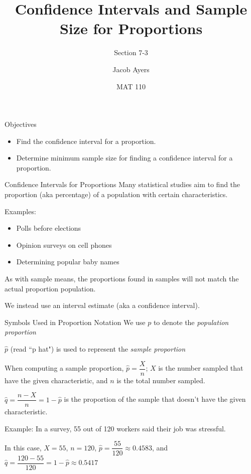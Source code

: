 \documentclass[t, aspectratio=169]{beamer}
\title[7-3]{Confidence Intervals and Sample Size for Proportions}
\subtitle{Section 7-3}
\author{Jacob Ayers}
\institute{Lesson \#23}
\date{MAT 110}
\newcommand{\?}{\stackrel{?}{=}}
\begin{document}
	
	\begin{frame}
		\titlepage
	\end{frame}
	
	\begin{frame}{Objectives}
		\begin{itemize}
			\item Find the confidence interval for a proportion.
			\item Determine minimum sample size for finding a confidence interval for a proportion.
		\end{itemize}
	\end{frame}

	\begin{frame}{Confidence Intervals for Proportions}
		Many statistical studies aim to find the proportion (aka percentage) of a population with certain characteristics. \pause
		
		Examples: \begin{itemize}
			\item Polls before elections \pause
			\item Opinion surveys on cell phones \pause
			\item Determining popular baby names \pause
		\end{itemize}
	
		As with sample means, the proportions found in samples will not match the actual proportion population. \pause
		
		We instead use an interval estimate (aka a confidence interval).
	\end{frame}

	\begin{frame}{Symbols Used in Proportion Notation}
		We use $p$ to denote the \textit{population proportion} \pause
		
		$\hat{p}$ (read ``p hat") is used to represent the \textit{sample proportion} \pause
		
		When computing a sample proportion, $\hat{p} = \dfrac{X}{n}$; $X$ is the number sampled that have the given characteristic, and $n$ is the total number sampled. \pause
		
		$\hat{q} = \dfrac{n - X}{n} = 1 - \hat{p}$ is the proportion of the sample that doesn't have the given characteristic.
		
		Example: In a survey, 55 out of 120 workers said their job was stressful. \pause
		
		In this case, $X = 55$, \pause $n = 120$, \pause $\hat{p} = \dfrac{55}{120} \approx 0.4583$, \pause and $\hat{q} = \dfrac{120 - 55}{120} = 1 - \hat{p} \approx 0.5417$
	\end{frame}
\end{document}
